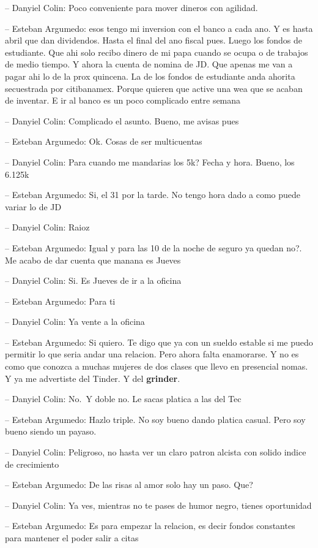 -- Danyiel Colin: Poco conveniente para mover dineros con agilidad.

-- Esteban Argumedo: esos tengo mi inversion con el banco a cada ano. Y
es hasta abril que dan dividendos. Hasta el final del ano fiscal pues.
Luego los fondos de estudiante. Que ahi solo recibo dinero de mi papa
cuando se ocupa o de trabajos de medio tiempo. Y ahora la cuenta de
nomina de JD. Que apenas me van a pagar ahi lo de la prox quincena. La
de los fondos de estudiante anda ahorita secuestrada por citibanamex.
Porque quieren que active una wea que se acaban de inventar. E ir al
banco es un poco complicado entre semana

-- Danyiel Colin: Complicado el asunto. Bueno, me avisas pues

-- Esteban Argumedo: Ok. Cosas de ser multicuentas

-- Danyiel Colin: Para cuando me mandarias los 5k? Fecha y hora. Bueno,
los 6.125k

-- Esteban Argumedo: Si, el 31 por la tarde. No tengo hora dado a como
puede variar lo de JD

-- Danyiel Colin: Raioz

-- Esteban Argumedo: Igual y para las 10 de la noche de seguro ya quedan
no?. Me acabo de dar cuenta que manana es Jueves

-- Danyiel Colin: Si. Es Jueves de ir a la oficina

-- Esteban Argumedo: Para ti

-- Danyiel Colin: Ya vente a la oficina

-- Esteban Argumedo: Si quiero. Te digo que ya con un sueldo estable si
me puedo permitir lo que seria andar una relacion. Pero ahora falta
enamorarse. Y no es como que conozca a muchas mujeres de dos clases que
llevo en presencial nomas. Y ya me advertiste del Tinder. Y del
\textbf{grinder}.

-- Danyiel Colin: No.~Y doble no. Le sacas platica a las del Tec

-- Esteban Argumedo: Hazlo triple. No soy bueno dando platica casual.
Pero soy bueno siendo un payaso.

-- Danyiel Colin: Peligroso, no hasta ver un claro patron alcista con
solido indice de crecimiento

-- Esteban Argumedo: De las risas al amor solo hay un paso. Que?

-- Danyiel Colin: Ya ves, mientras no te pases de humor negro, tienes
oportunidad

-- Esteban Argumedo: Es para empezar la relacion, es decir fondos
constantes para mantener el poder salir a citas

